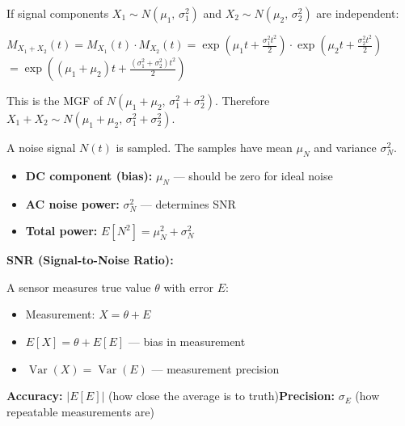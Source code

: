 
If signal components $X_{1} \sim N(\mu_{1},\, \sigma_{1}^{2})$ and $X_{2} \sim N(\mu_{2},\, \sigma_{2}^{2})$ are independent:

$M_{X_{1}+X_{2}}(t) = M_{X_{1}}(t) \cdot M_{X_{2}}(t)$\PSbr{}$\displaystyle = \exp \left(\mu_{1}t + \frac{\sigma_{1}^{2}t^{2}}{2}\right) \cdot \exp \left(\mu_{2}t + \frac{\sigma_{2}^{2}t^{2}}{2}\right)$\PSbr{}$\displaystyle = \exp \left((\mu_{1}+\mu_{2})t + \frac{(\sigma_{1}^{2}+\sigma_{2}^{2})t^{2}}{2}\right)$

This is the MGF of $N(\mu_{1}+\mu_{2},\, \sigma_{1}^{2}+\sigma_{2}^{2})$. Therefore $X_{1}+X_{2} \sim N(\mu_{1}+\mu_{2},\, \sigma_{1}^{2}+\sigma_{2}^{2})$.



A noise signal $N(t)$ is sampled. The samples have mean $\mu_{N}$ and variance $\sigma_{N}^{2}$.

\begin{itemize}
\tightlist
\item
  \textbf{DC component (bias):} $\mu_{N}$ — should be zero for ideal noise
\item
  \textbf{AC noise power:} $\sigma_{N}^{2}$ — determines SNR
\item
  \textbf{Total power:} $E[N^{2}] = \mu_{N}^{2} + \sigma_{N}^{2}$
\end{itemize}

\textbf{SNR (Signal-to-Noise Ratio):}


A sensor measures true value $\theta$ with error $E$:

\begin{itemize}
\tightlist
\item
  Measurement: $X = \theta + E$
\item
  $E[X] = \theta + E[E]$ — bias in measurement
\item
  $\operatorname{Var}(X) = \operatorname{Var}(E)$ — measurement precision
\end{itemize}

\textbf{Accuracy:} $\lvert E[E]\rvert$ (how close the average is to truth)\PSbr{}\textbf{Precision:} $\sigma_{E}$ (how repeatable measurements are)

